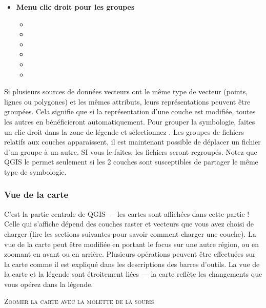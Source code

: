 \begin{itemize}
\item \textbf{Menu clic droit pour les groupes} 
\begin{itemize}
\item {}
\item {}
\item {}
\item {}
\item {}
\item {}
\end{itemize}

\end{itemize}

Si plusieurs sources de données vecteurs ont le même type de vecteur (points, lignes ou polygones) et les mêmes attributs, leurs représentations peuvent être groupées. Cela signifie que si la représentation d'une couche est modifiée, toutes les autres en bénéficieront automatiquement. Pour grouper la symbologie, faites un clic droit dans la zone de légende et sélectionnez . Les groupes de fichiers relatifs aux couches apparaissent, il est maintenant possible de déplacer un fichier d'un groupe à un autre. SI vous le faites, les fichiers seront regroupés. Notez que QGIS le permet seulement si les 2 couches sont susceptibles de partager le même type de symbologie.

\subsubsection{Vue de la carte}\label{label_mapview}

C'est la partie centrale de QGIS — les cartes sont affichées dans cette partie ! Celle qui s'affiche dépend des couches raster et vecteurs que vous avez choisi de charger (lire les sections suivantes pour savoir comment charger une couche). La vue de la carte peut être modifiée en portant le focus sur une autre région, ou en zoomant en avant ou en arrière. Plusieurs opérations peuvent être effectuées sur la carte comme il est expliqué dans les descriptions des barres d'outils. La vue de la carte et la légende sont étroitement liées — la carte reflète les changements que vous opérez dans la légende.

\begin{Astuce}\caption{\textsc{Zoomer la carte avec la molette de la souris}}
\end{Astuce}

